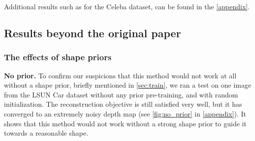 Additional results such as for the Celeba dataset, can be found in the \autoref{appendix}.

\subsection{Results beyond the original paper}

\subsubsection{The effects of shape priors}
\label{sec:results_priors}
\textbf{No prior.} To confirm our suspicions that this method would not work at all without a shape prior, briefly mentioned in \ref{sec:train}, we ran a test on one image from the LSUN Car dataset without any prior pre-training, and with random initialization. The reconstruction objective is still satisfied very well, but it has converged to an extremely noisy depth map (see \autoref{fig:no_prior} in \autoref{appendix}). It shows that this method would not work without a strong shape prior to guide it towards a reasonable shape.


